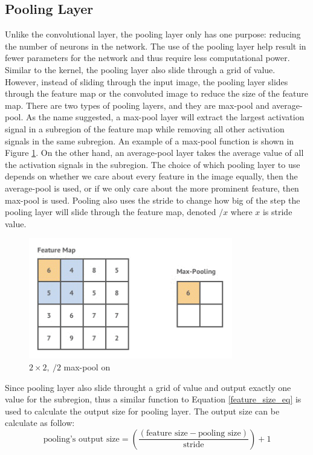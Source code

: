 \subsection{Pooling Layer}
Unlike the convolutional layer, the pooling layer only has one purpose: reducing the number of neurons in the network. The use of the pooling layer help result in fewer parameters for the network and thus require less computational power. Similar to the kernel, the pooling layer also slide through a grid of value. However, instead of sliding through the input image, the pooling layer slides through the feature map or the convoluted image to reduce the size of the feature map. There are two types of pooling layers, and they are max-pool and average-pool. As the name suggested, a max-pool layer will extract the largest activation signal in a subregion of the feature map while removing all other activation signals in the same subregion. An example of a max-pool function is shown in Figure \ref{fig:max_pool_diagram}. On the other hand, an average-pool layer takes the average value of all the activation signals in the subregion. The choice of which pooling layer to use depends on whether we care about every feature in the image equally, then the average-pool is used, or if we only care about the more prominent feature, then max-pool is used. Pooling also uses the stride to change how big of the step the pooling layer will slide through the feature map, denoted $/x$ where $x$ is stride value.
%
\begin{figure}[!ht]
    \centering
    \includegraphics[width=3.5in]{figures/max_pool.png}
    \caption{$2 \times 2,\ /2$ max-pool on \cite{zeiler2014visualizing}}
    \label{fig:max_pool_diagram}
\end{figure}
%
Since pooling layer also slide throught a grid of value and output exactly one value for the subregion, thus a similar function to Equation \ref{feature_size_eq} is used to calculate the output size for pooling layer. The output size can be calculate as follow:
\[
    \text{pooling's output size} = \left(\frac{(\text{feature size} - \text{pooling size})}{\text{stride}} \right) + 1
\]

